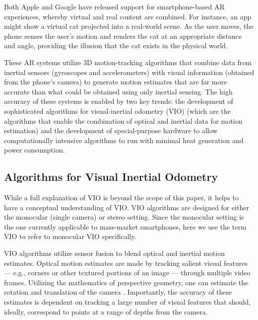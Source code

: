 \documentclass[chi_draft]{sigchi}
\newcommand{\BVI}{B/VI\xspace}
\newcommand{\OM}{O\&M\xspace}
\begin{document}
Both Apple and Google have released support for smartphone-based AR experiences, whereby virtual and real content are combined.  For instance, an app might show a virtual cat projected into a real-world scene.  As the user moves, the phone senses the user's motion and renders the cat at an appropriate distance and angle, providing the illusion that the cat exists in the physical world.

These AR systems utilize 3D motion-tracking algorithms that combine data from inertial sensors (gyroscopes and accelerometers) with visual information (obtained from the phone's camera) to generate motion estimates that are far more accurate than what could be obtained using only inertial sensing.  The high accuracy of these systems is enabled by two key trends: the development of sophisticated algorithms for visual-inertial odometry (VIO) \cite{li2013high,leutenegger2015keyframe,bloesch2015robust,forster2014svo} (which are the algorithms that enable the combination of optical and inertial data for motion estimation) and the development of special-purpose hardware to allow computationally intensive algorithms to run with minimal heat generation and power consumption.%

\subsection{Algorithms for Visual Inertial Odometry}
While a full explanation of VIO \cite{gui2015review} is beyond the scope of this paper, it helps to have a conceptual understanding of VIO.  VIO algorithms are designed for either the monocular (single camera) or stereo setting.  Since the monocular setting is the one currently applicable to mass-market smartphones, here we use the term VIO to refer to monocular VIO specifically.

VIO algorithms utilize sensor fusion to blend optical and inertial motion estimates.  Optical motion estimates are made by tracking salient visual features --- e.g., corners or other textured portions of an image --- through multiple video frames.  Utilizing the mathematics of perspective geometry, one can estimate the rotation and translation of the camera \cite{Hartley2004}.  Importantly, the accuracy of these estimates is dependent on tracking a large number of visual features that should, ideally, correspond to points at a range of depths from the camera.%
\end{document}
